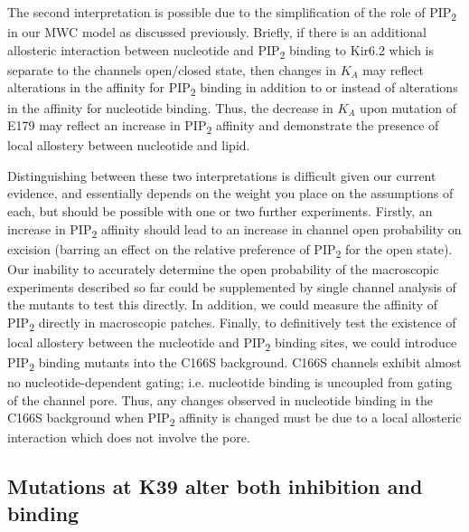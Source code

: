 The second interpretation is possible due to the simplification of the role of PIP\textsubscript{2} in our MWC model as discussed previously.
Briefly, if there is an additional allosteric interaction between nucleotide and PIP\textsubscript{2} binding to Kir6.2 which is separate to the channels open/closed state, then changes in $K_A$ may reflect alterations in the affinity for PIP\textsubscript{2} binding in addition to or instead of alterations in the affinity for nucleotide binding.
Thus, the decrease in $K_A$ upon mutation of E179 may reflect an increase in PIP\textsubscript{2} affinity and demonstrate the presence of local allostery between nucleotide and lipid.

Distinguishing between these two interpretations is difficult given our current evidence, and essentially depends on the weight you place on the assumptions of each, but should be possible with one or two further experiments.
Firstly, an increase in PIP\textsubscript{2} affinity should lead to an increase in channel open probability on excision (barring an effect on the relative preference of PIP\textsubscript{2} for the open state).
Our inability to accurately determine the open probability of the macroscopic experiments described so far could be supplemented by single channel analysis of the mutants to test this directly.
In addition, we could measure the affinity of PIP\textsubscript{2} directly in macroscopic patches.
Finally, to definitively test the existence of local allostery between the nucleotide and PIP\textsubscript{2} binding sites, we could introduce PIP\textsubscript{2} binding mutants into the C166S background.
C166S channels exhibit almost no nucleotide-dependent gating; i.e. nucleotide binding is uncoupled from gating of the channel pore.
Thus, any changes observed in nucleotide binding in the C166S background when PIP\textsubscript{2} affinity is changed must be due to a local allosteric interaction which does not involve the pore.

\subsection{Mutations at K39 alter both inhibition and binding}

